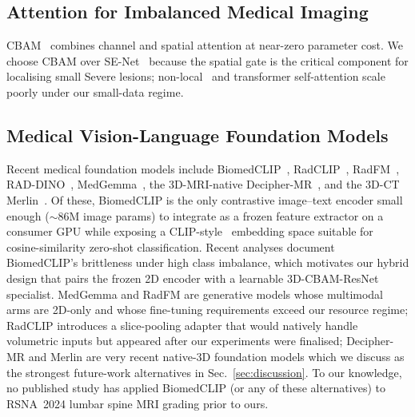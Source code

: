 \subsection{Attention for Imbalanced Medical Imaging}
CBAM~\cite{woo2018cbam} combines channel and spatial attention at near-zero
parameter cost. We choose CBAM over SE-Net~\cite{hu2018senet} because the
spatial gate is the critical component for localising small Severe
lesions; non-local~\cite{wang2018nonlocal} and transformer self-attention
scale poorly under our small-data regime.

\subsection{Medical Vision-Language Foundation Models}
Recent medical foundation models include BiomedCLIP~\cite{zhang2023biomedclip},
RadCLIP~\cite{lu2024radclip}, RadFM~\cite{wu2025radfm},
RAD-DINO~\cite{perezgarcia2024raddino}, MedGemma~\cite{sebro2025medgemma},
the 3D-MRI-native Decipher-MR~\cite{yang2026deciphermr}, and the 3D-CT
Merlin~\cite{blankemeier2026merlin}. Of these, BiomedCLIP is the only
contrastive image--text encoder small enough (${\sim}86$M image params)
to integrate as a frozen feature extractor on a consumer GPU while
exposing a CLIP-style~\cite{radford2021clip} embedding space suitable
for cosine-similarity zero-shot classification. Recent analyses
\cite{biomedclipImbalance2025} document BiomedCLIP's brittleness under
high class imbalance, which motivates our hybrid design that pairs the
frozen 2D encoder with a learnable 3D-CBAM-ResNet specialist.
MedGemma and RadFM are generative models whose multimodal arms are
2D-only and whose fine-tuning requirements exceed our resource regime;
RadCLIP introduces a slice-pooling adapter that would natively handle
volumetric inputs but appeared after our experiments were finalised;
Decipher-MR and Merlin are very recent native-3D foundation models
which we discuss as the strongest future-work alternatives in
Sec.~\ref{sec:discussion}. To our knowledge, no published study has
applied BiomedCLIP (or any of these alternatives) to RSNA~2024 lumbar
spine MRI grading prior to ours.
